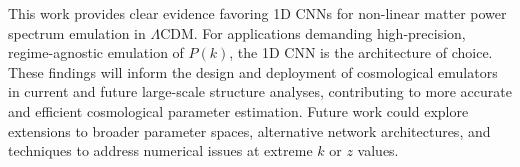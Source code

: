 \documentclass[twocolumn]{aastex631}
\begin{document}
This work provides clear evidence favoring 1D CNNs for non-linear matter power spectrum emulation in \(\Lambda\)CDM. For applications demanding high-precision, regime-agnostic emulation of $P(k)$, the 1D CNN is the architecture of choice. These findings will inform the design and deployment of cosmological emulators in current and future large-scale structure analyses, contributing to more accurate and efficient cosmological parameter estimation. Future work could explore extensions to broader parameter spaces, alternative network architectures, and techniques to address numerical issues at extreme $k$ or $z$ values.



\end{document}
